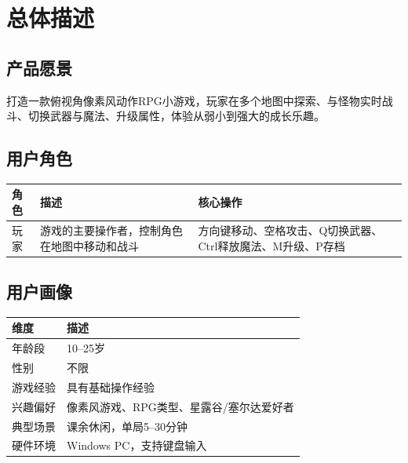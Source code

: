 \documentclass[12pt,a4paper]{article}
\begin{document}
\section{总体描述}

\subsection{产品愿景}

打造一款俯视角像素风动作RPG小游戏，玩家在多个地图中探索、与怪物实时战斗、切换武器与魔法、升级属性，体验从弱小到强大的成长乐趣。

\subsection{用户角色}

\begin{table}[htbp]
\centering
\begin{tabularx}{\textwidth}{lXX}
\toprule
\textbf{角色} & \textbf{描述} & \textbf{核心操作} \\
\midrule
玩家 & 游戏的主要操作者，控制角色在地图中移动和战斗 & 方向键移动、空格攻击、Q切换武器、Ctrl释放魔法、M升级、P存档 \\
\bottomrule
\end{tabularx}
\end{table}

\subsection{用户画像}

\begin{table}[htbp]
\centering
\begin{tabularx}{\textwidth}{lX}
\toprule
\textbf{维度} & \textbf{描述} \\
\midrule
年龄段 & 10--25岁 \\
性别 & 不限 \\
游戏经验 & 具有基础操作经验 \\
兴趣偏好 & 像素风游戏、RPG类型、星露谷/塞尔达爱好者 \\
典型场景 & 课余休闲，单局5--30分钟 \\
硬件环境 & Windows PC，支持键盘输入 \\
\bottomrule
\end{tabularx}
\end{table}
\end{document}

